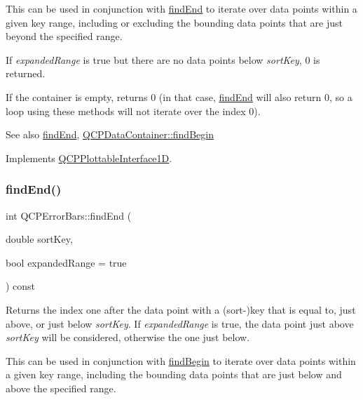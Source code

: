 This can be used in conjunction with \mbox{\hyperlink{class_q_c_p_error_bars_ad22dd8499c6d45176ad0651751a0b0b0}{find\+End}} to iterate over data points within a given key range, including or excluding the bounding data points that are just beyond the specified range.

If {\itshape expanded\+Range} is true but there are no data points below {\itshape sort\+Key}, 0 is returned.

If the container is empty, returns 0 (in that case, \mbox{\hyperlink{class_q_c_p_error_bars_ad22dd8499c6d45176ad0651751a0b0b0}{find\+End}} will also return 0, so a loop using these methods will not iterate over the index 0).

\begin{DoxySeeAlso}{See also}
\mbox{\hyperlink{class_q_c_p_error_bars_ad22dd8499c6d45176ad0651751a0b0b0}{find\+End}}, \mbox{\hyperlink{class_q_c_p_data_container_a2ad8a5399072d99a242d3a6d2d7e278a}{Q\+C\+P\+Data\+Container\+::find\+Begin}} 
\end{DoxySeeAlso}


Implements \mbox{\hyperlink{class_q_c_p_plottable_interface1_d_a5b95783271306a4de97be54eac1e7d13}{Q\+C\+P\+Plottable\+Interface1D}}.

\mbox{\label{class_q_c_p_error_bars_ad22dd8499c6d45176ad0651751a0b0b0}} 
\subsubsection{\texorpdfstring{findEnd()}{findEnd()}}
{\footnotesize\ttfamily int Q\+C\+P\+Error\+Bars\+::find\+End (\begin{DoxyParamCaption}\item[{double}]{sort\+Key,  }\item[{bool}]{expanded\+Range = {\ttfamily true} }\end{DoxyParamCaption}) const\hspace{0.3cm}{\ttfamily [virtual]}}

Returns the index one after the data point with a (sort-\/)key that is equal to, just above, or just below {\itshape sort\+Key}. If {\itshape expanded\+Range} is true, the data point just above {\itshape sort\+Key} will be considered, otherwise the one just below.

This can be used in conjunction with \mbox{\hyperlink{class_q_c_p_error_bars_a74c57d6abb8eda3c4c31b72d1df9f568}{find\+Begin}} to iterate over data points within a given key range, including the bounding data points that are just below and above the specified range.

